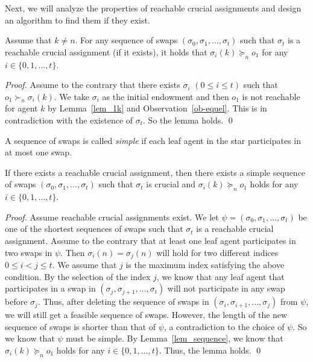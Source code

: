 Next, we will analyze the properties of reachable crucial assignments and design an algorithm to find them if they exist.


\begin{lemma}\label{lem_sequence}
Assume that $k\neq n$.
    For any sequence of swaps $(\sigma_0,\sigma_1,\dots,\sigma_t)$ such that $\sigma_t$ is a reachable crucial assignment (if it exists),
    it holds that $\sigma_i(k)\succeq_n o_1$ for any $i\in \{0,1,\dots, t\}$.
\end{lemma}
\begin{proof}
Assume to the contrary that there exists $\sigma_i$ $(0\leq i \leq t)$ such that  $o_1 \succ_n \sigma_i(k)$. We take $\sigma_i$ as the initial endowment and then
$o_1$ is not reachable for agent $k$ by Lemma~\ref{lem_1k} and Observation~\ref{ob-equel}. This is in contradiction with the existence of $\sigma_t$. So the lemma holds.
\qed
\end{proof}


\begin{definition}
A sequence of swaps is called \emph{simple} if each leaf agent in the star participates in at most one swap.
\end{definition}


\begin{lemma}\label{lem_sequence2}
If there exists a reachable crucial assignment, then there exists
a simple sequence of swaps $(\sigma_0,\sigma_1,\dots,\sigma_t)$ such that $\sigma_t$ is crucial and $\sigma_i(k)\succeq_n o_1$ holds for any $i\in \{0,1,\dots, t\}$.
\end{lemma}
\begin{proof}
Assume reachable crucial assignments exist. We let  $\psi=(\sigma_0,\sigma_1,\dots,\sigma_t)$ be one of the shortest sequences of swaps such that $\sigma_t$ is a reachable crucial assignment. Assume to the contrary that at least one leaf agent participates in two swaps in $\psi$. Then $\sigma_i(n)=\sigma_j(n)$ will hold for two different indices $0\leq i < j \leq t$. We assume that $j$ is the maximum index satisfying the above condition. By the selection of the index $j$, we know that any leaf agent that participates in a swap in $(\sigma_j,\sigma_{j+1},\dots,\sigma_t)$ will not participate in any swap before $\sigma_j$. Thus, after deleting the sequence of swaps in $(\sigma_i,\sigma_{i+1},\dots,\sigma_j)$
    from $\psi$, we will still get a feasible sequence of swaps. However, the length of the new sequence of swaps is shorter than that of $\psi$, a contradiction to the choice of $\psi$.
    So we know that $\psi$ must be simple. By Lemma~\ref{lem_sequence}, we know that $\sigma_i(k)\succeq_n o_1$ holds for any $i\in \{0,1,\dots, t\}$. Thus, the lemma holds.
\qed
\end{proof}




